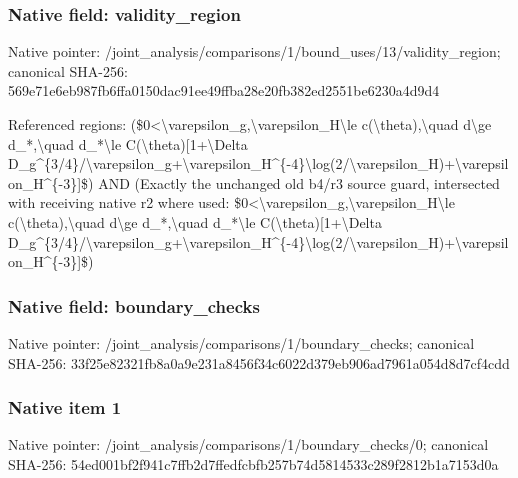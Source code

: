 \documentclass[10pt,a4paper]{article}
\begin{document}
\subsubsection{Native field: validity\_\allowbreak{}region}
Native pointer: /joint\_\allowbreak{}analysis/comparisons/1/bound\_\allowbreak{}uses/13/validity\_\allowbreak{}region; canonical SHA-256: 569e71e6eb987fb6ffa0150dac91ee49ffba28e20fb382ed2551be6230a4d9d4

\begingroup\raggedright\sloppy Referenced regions:\allowbreak{} (\$0<\textbackslash{}varepsilon\_\allowbreak{}g,\allowbreak{}\textbackslash{}varepsilon\_\allowbreak{}H\textbackslash{}le c(\textbackslash{}theta),\allowbreak{}\textbackslash{}quad d\textbackslash{}ge d\_\allowbreak{}*,\allowbreak{}\textbackslash{}quad d\_\allowbreak{}*\textbackslash{}le C(\textbackslash{}theta)[1+\textbackslash{}Delta D\_\allowbreak{}g\textasciicircum{}\{3/\allowbreak{}4\}/\allowbreak{}\textbackslash{}varepsilon\_\allowbreak{}g+\textbackslash{}varepsilon\_\allowbreak{}H\textasciicircum{}\{-4\}\textbackslash{}log(2/\allowbreak{}\textbackslash{}varepsilon\_\allowbreak{}H)+\textbackslash{}varepsilon\_\allowbreak{}H\textasciicircum{}\{-3\}]\$) AND (Exactly the unchanged old b4/\allowbreak{}r3 source guard,\allowbreak{} intersected with receiving native r2 where used:\allowbreak{} \$0<\textbackslash{}varepsilon\_\allowbreak{}g,\allowbreak{}\textbackslash{}varepsilon\_\allowbreak{}H\textbackslash{}le c(\textbackslash{}theta),\allowbreak{}\textbackslash{}quad d\textbackslash{}ge d\_\allowbreak{}*,\allowbreak{}\textbackslash{}quad d\_\allowbreak{}*\textbackslash{}le C(\textbackslash{}theta)[1+\textbackslash{}Delta D\_\allowbreak{}g\textasciicircum{}\{3/\allowbreak{}4\}/\allowbreak{}\textbackslash{}varepsilon\_\allowbreak{}g+\textbackslash{}varepsilon\_\allowbreak{}H\textasciicircum{}\{-4\}\textbackslash{}log(2/\allowbreak{}\textbackslash{}varepsilon\_\allowbreak{}H)+\textbackslash{}varepsilon\_\allowbreak{}H\textasciicircum{}\{-3\}]\$)\par\endgroup

\subsubsection{Native field: boundary\_\allowbreak{}checks}
Native pointer: /joint\_\allowbreak{}analysis/comparisons/1/boundary\_\allowbreak{}checks; canonical SHA-256: 33f25e82321fb8a0a9e231a8456f34c6022d379eb906ad7961a054d8d7cf4cdd

\subsubsection{Native item 1}
Native pointer: /joint\_\allowbreak{}analysis/comparisons/1/boundary\_\allowbreak{}checks/0; canonical SHA-256: 54ed001bf2f941c7ffb2d7ffedfcbfb257b74d5814533c289f2812b1a7153d0a
\end{document}
